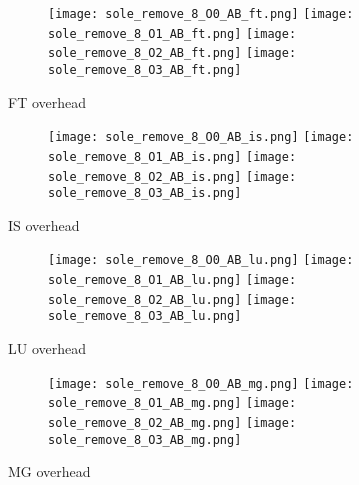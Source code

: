 \documentclass[11pt]{article}
\begin{document}
    \begin{figure}[ht]
        \begin{subfigure}{\linewidth}
            \texttt{[image: sole\_remove\_8\_O0\_AB\_ft.png]}
            \texttt{[image: sole\_remove\_8\_O1\_AB\_ft.png]}
            \texttt{[image: sole\_remove\_8\_O2\_AB\_ft.png]}
            \texttt{[image: sole\_remove\_8\_O3\_AB\_ft.png]}
        \end{subfigure}\par\medskip
        \caption{FT overhead}
        \label{fig:sole_figs_4}
    \end{figure}
\begin{figure}[ht]
        \begin{subfigure}{\linewidth}
            \texttt{[image: sole\_remove\_8\_O0\_AB\_is.png]}\hfill
            \texttt{[image: sole\_remove\_8\_O1\_AB\_is.png]}\hfill
            \texttt{[image: sole\_remove\_8\_O2\_AB\_is.png]}\hfill
            \texttt{[image: sole\_remove\_8\_O3\_AB\_is.png]}\hfill
        \end{subfigure}\par\medskip
        \caption{IS overhead}
        \label{fig:sole_figs_5}
    \end{figure}

    \begin{figure}[ht]
        \begin{subfigure}{\linewidth}
            \texttt{[image: sole\_remove\_8\_O0\_AB\_lu.png]}\hfill
            \texttt{[image: sole\_remove\_8\_O1\_AB\_lu.png]}\hfill
            \texttt{[image: sole\_remove\_8\_O2\_AB\_lu.png]}\hfill
            \texttt{[image: sole\_remove\_8\_O3\_AB\_lu.png]}\hfill
        \end{subfigure}\par\medskip
        \caption{LU overhead}
        \label{fig:sole_figs_6}
    \end{figure}

    \begin{figure}[ht]
        \begin{subfigure}{\linewidth}
            \texttt{[image: sole\_remove\_8\_O0\_AB\_mg.png]}\hfill
            \texttt{[image: sole\_remove\_8\_O1\_AB\_mg.png]}\hfill
            \texttt{[image: sole\_remove\_8\_O2\_AB\_mg.png]}\hfill
            \texttt{[image: sole\_remove\_8\_O3\_AB\_mg.png]}\hfill
        \end{subfigure}\par\medskip
        \caption{MG overhead}
        \label{fig:sole_figs_7}
    \end{figure}
\end{document}
